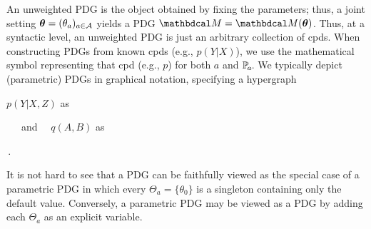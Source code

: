 \documentclass[twoside]{article}
\theoremstyle{plain}
\theoremstyle{definition}
\theoremstyle{remark}
\newcommand\btheta{\boldsymbol\theta}
\begin{document}
An unweighted PDG is the object obtained by fixing the parameters; thus,
a
joint setting
$\btheta = (\theta_a)_{a \in \Ar}$ yields a PDG
$\dg M = \dg M(\btheta)$.
Thus, at a syntactic level, an unweighted PDG is just an arbitrary collection of cpds. 
When constructing PDGs from known cpds (e.g., $p(Y|X)$), we use the mathematical symbol representing that cpd (e.g., $p$) for both $a$ and $\p_a$. 
We typically depict (parametric) PDGs in graphical notation, specifying a hypergraph 
\vspace{-3ex}
\begin{center}
$p(Y|X,Z)$ \;as\;
\,
$\quad$and$\quad$ $q(A,B)$ \;as\;
\,.
\end{center}

It is not hard to see that a PDG can be faithfully viewed as the special case of a parametric PDG in which every 
$\Theta_a = \{ \theta_0 \}$ is a singleton containing only the default value.
Conversely, a parametric PDG may be viewed as a PDG by adding each $\Theta_a$ as an explicit variable.
\end{document}
